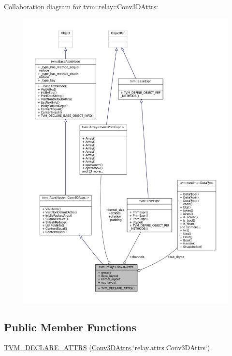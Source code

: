 Collaboration diagram for tvm\+:\+:relay\+:\+:Conv3\+D\+Attrs\+:
\nopagebreak
\begin{figure}[H]
\begin{center}
\leavevmode
\includegraphics[width=350pt]{structtvm_1_1relay_1_1Conv3DAttrs__coll__graph}
\end{center}
\end{figure}
\subsection*{Public Member Functions}
\begin{DoxyCompactItemize}
\item 
\hyperlink{structtvm_1_1relay_1_1Conv3DAttrs_a0b63383d57cc4f111b3496299b951d7c}{T\+V\+M\+\_\+\+D\+E\+C\+L\+A\+R\+E\+\_\+\+A\+T\+T\+RS} (\hyperlink{structtvm_1_1relay_1_1Conv3DAttrs}{Conv3\+D\+Attrs},\char`\"{}relay.\+attrs.\+Conv3\+D\+Attrs\char`\"{})
\end{DoxyCompactItemize}
